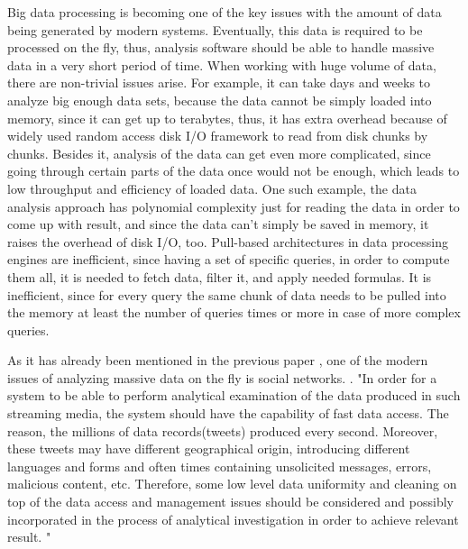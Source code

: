\documentclass[10pt,journal,final,letterpaper,twocolumn]{IEEEtran}
\begin{document}
Big data processing is becoming one of the key issues with the amount of data being generated by modern systems. Eventually, this data is required to be processed on the fly, thus, analysis software should be able to handle massive data in a very short period of time. When working with huge volume of data, there are non-trivial issues arise. For example, it can take days and weeks to analyze big enough data sets, because the data cannot be simply loaded into memory, since it can get up to terabytes, thus, it has extra overhead because of widely used random access disk I/O framework to read from disk chunks by chunks. Besides it, analysis of the data can get even more complicated, since going through certain parts of the data once would not be enough, which leads to low throughput and efficiency of loaded data. One such example, the data analysis approach has polynomial complexity just for reading the data in order to come up with result, and since the data can't simply be saved in memory, it raises the overhead of disk I/O, too. Pull-based architectures in data processing engines are inefficient, since having a set of specific queries, in order to compute them all, it is needed to fetch data, filter it, and apply needed formulas. It is inefficient, since for every query the same chunk of data needs to be pulled into the memory at least the number of queries times or more in case of more complex queries.

As it has already been mentioned in the previous paper \cite{mainPaper}, one of the modern issues of analyzing massive data on the fly is social networks. .
"In order for a system to be able to perform analytical examination of the data produced in such streaming media, the system should have the capability of fast data access. The reason, the millions of data records(tweets) produced
every second. Moreover, these tweets may have
different geographical origin, introducing different languages and
forms and often times containing unsolicited messages, errors,
malicious content, etc. Therefore, some low level data uniformity
and cleaning on top of the data access and management issues should
be considered and possibly incorporated in the process of analytical
investigation in order to achieve relevant result. "\cite{mainPaper, nature_bigdata08,nature_bigdata12,science_social10,jcs_twitter11}
\end{document}
